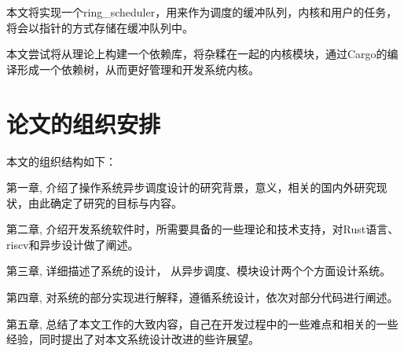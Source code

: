 本文将实现一个ring\_scheduler，用来作为调度的缓冲队列，内核和用户的任务，将会以指针的方式存储在缓冲队列中。

本文尝试将从理论上构建一个依赖库，将杂糅在一起的内核模块，通过Cargo的编译形成一个依赖树，从而更好管理和开发系统内核。

\section{论文的组织安排}

本文的组织结构如下：

第一章, 介绍了操作系统异步调度设计的研究背景，意义，相关的国内外研究现状，由此确定了研究的目标与内容。

第二章, 介绍开发系统软件时，所需要具备的一些理论和技术支持，对Rust语言、riscv和异步设计做了阐述。

第三章, 详细描述了系统的设计， 从异步调度、模块设计两个个方面设计系统。

第四章, 对系统的部分实现进行解释，遵循系统设计，依次对部分代码进行阐述。

第五章, 总结了本文工作的大致内容，自己在开发过程中的一些难点和相关的一些经验，同时提出了对本文系统设计改进的些许展望。
